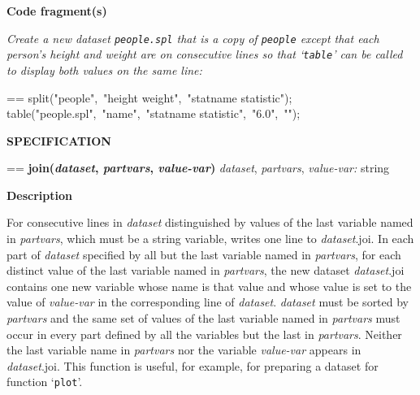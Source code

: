 \documentclass{book}
\makeatletter
\newcommand\Texinfocommandstyletextvar[1]{{\normalfont{}\textsl{#1}}}%
\newenvironment{Texinfopreformatted}{%
  \par\GNUTobeylines\obeyspaces\frenchspacing\parskip=\z@\parindent=\z@}{}
{\catcode`\^^M=13 \gdef\GNUTobeylines{\catcode`\^^M=13 \def^^M{\null\par}}}
\newenvironment{Texinfoindented}{\begin{list}{}{}\item\relax}{\end{list}}
\renewcommand{\_}{\Texinfounderscore\discretionary{}{}{}}
\makeatother
\begin{document}
\noindent{}\textbf{Code fragment(s)}

\emph{Create a new dataset \texttt{people.spl} that is a copy of
\texttt{people} except that each person's height and weight are on consecutive lines
so that `\texttt{table}' can be called to display both values on the same line:}
\begin{Texinfoindented}
\begin{Texinfopreformatted}%
\ttfamily split("people",\ "height weight",\ "statname statistic");
table("people.spl",\ "name",\ "statname statistic",\ "6.0",\ "");
\end{Texinfopreformatted}
\end{Texinfoindented}

\noindent{}\textbf{SPECIFICATION}
\begin{Texinfoindented}
\begin{Texinfopreformatted}%
\textbf{join(\Texinfocommandstyletextvar{dataset}, \Texinfocommandstyletextvar{partvars}, \Texinfocommandstyletextvar{value-var})}
\Texinfocommandstyletextvar{dataset}, \Texinfocommandstyletextvar{partvars}, \Texinfocommandstyletextvar{value-var:} string
\end{Texinfopreformatted}
\end{Texinfoindented}
%

\noindent{}\textbf{Description}

For consecutive lines in \Texinfocommandstyletextvar{dataset} distinguished by values of
the last variable named in \Texinfocommandstyletextvar{partvars}, which must be a string
variable, writes one line to \Texinfocommandstyletextvar{dataset}.joi.
In each part of \Texinfocommandstyletextvar{dataset} specified by all but the last variable
named in \Texinfocommandstyletextvar{partvars},
for each distinct value of the last variable named in \Texinfocommandstyletextvar{partvars},
the new dataset \Texinfocommandstyletextvar{dataset}.joi contains one new variable
whose name is that value and whose value is set to the value of
\Texinfocommandstyletextvar{value-var} in the corresponding line of \Texinfocommandstyletextvar{dataset}.
\Texinfocommandstyletextvar{dataset} must be sorted by \Texinfocommandstyletextvar{partvars} and
the same set of values of the last variable named in \Texinfocommandstyletextvar{partvars}
must occur in every part defined by all the variables but the last
in \Texinfocommandstyletextvar{partvars}.
Neither the last variable name in \Texinfocommandstyletextvar{partvars} nor
the variable \Texinfocommandstyletextvar{value-var} appears in \Texinfocommandstyletextvar{dataset}.joi.
This function is useful, for example, for preparing a dataset for
function `\texttt{plot}'.
\end{document}
